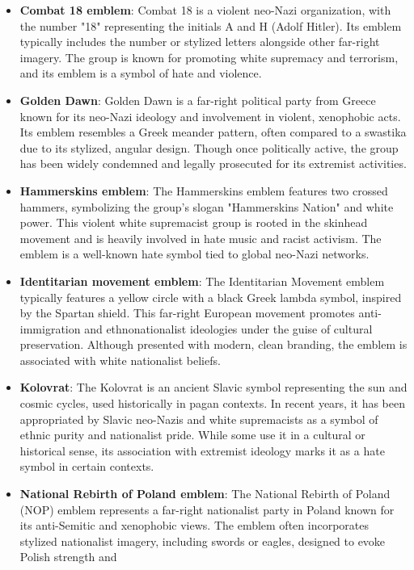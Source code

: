 \documentclass[11pt,a4paper,onecolumn]{article}
\begin{document}
\begin{itemize}
  identity and nationalism. This version is now widely recognized as a hate symbol
  in extremist contexts.
  \item \textbf{Combat 18 emblem}: Combat 18 is a violent neo-Nazi organization, with the
  number "18" representing the initials A and H (Adolf Hitler). Its emblem typically
  includes the number or stylized letters alongside other far-right imagery. The group
  is known for promoting white supremacy and terrorism, and its emblem is a symbol of
  hate and violence.
  \item \textbf{Golden Dawn}: Golden Dawn is a far-right political party from Greece known for its neo-Nazi ideology
  and involvement in violent, xenophobic acts. Its emblem resembles a Greek meander pattern, often compared to a
  swastika due to its stylized, angular design. Though once politically active, the group has been widely condemned
  and legally prosecuted for its extremist activities.
  \item \textbf{Hammerskins emblem}: The Hammerskins emblem features two crossed hammers, symbolizing the group's
  slogan "Hammerskins Nation" and white power. This violent white supremacist group is rooted in the skinhead
  movement and is heavily involved in hate music and racist activism. The emblem is a well-known hate symbol tied to
  global neo-Nazi networks.
  \item \textbf{Identitarian movement emblem}: The Identitarian Movement emblem typically features a yellow circle
  with a black Greek lambda symbol, inspired by the Spartan shield. This far-right European movement promotes
  anti-immigration and ethnonationalist ideologies under the guise of cultural preservation. Although presented with
  modern, clean branding, the emblem is associated with white nationalist beliefs.
  \item \textbf{Kolovrat}: The Kolovrat is an ancient Slavic symbol representing the sun and cosmic cycles, used
  historically in pagan contexts. In recent years, it has been appropriated by Slavic neo-Nazis and white
  supremacists as a symbol of ethnic purity and nationalist pride. While some use it in a cultural or historical
  sense, its association with extremist ideology marks it as a hate symbol in certain contexts.
  \item \textbf{National Rebirth of Poland emblem}: The National Rebirth of Poland (NOP) emblem represents a
  far-right nationalist party in Poland known for its anti-Semitic and xenophobic views. The emblem often
  incorporates stylized nationalist imagery, including swords or eagles, designed to evoke Polish strength and

\end{itemize}
\end{document}
